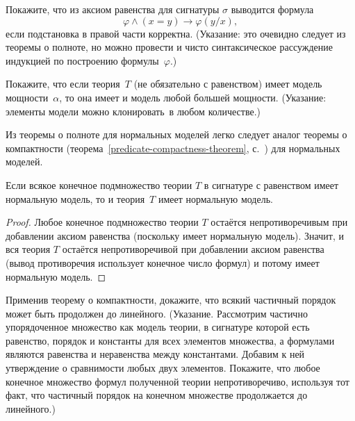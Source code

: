 \begin{problem}
Покажите, что из аксиом равенства для сигнатуры $\sigma$
выводится формула
        $$
 \varphi \land (x=y) \to \varphi(y/x),
        $$
если подстановка в правой части корректна. (Указание:
это очевидно следует из теоремы о полноте, но можно провести
и чисто синтаксическое рассуждение индукцией по построению
формулы~$\varphi$.)
\end{problem}

\begin{problem}
        \label{clones}%
Покажите, что если теория~$T$ (не обязательно с равенством)
имеет модель мощности~$\alpha$, то она имеет и модель
любой большей мощности. (Указание: элементы модели можно
 клонировать\ в любом количестве.)
\end{problem}

Из теоремы о полноте для нормальных моделей легко следует аналог
теоремы о компактности
(теорема~\ref{predicate-compactness-theorem},
с.~\pageref{predicate-compactness-theorem}) для нормальных
моделей.

\begin{theorem}
        \label{normal-compactness}%
Если всякое конечное подмножество теории $T$ в сигнатуре
с равенством имеет нормальную модель, то и теория~$T$
имеет нормальную модель.
\end{theorem}

\begin{proof}
Любое конечное подмножество теории $T$ остаётся непротиворечивым
при добавлении аксиом равенства (поскольку имеет нормальную модель).
Значит, и вся теория $T$ остаётся непротиворечивой при
добавлении аксиом равенства (вывод противоречия использует
конечное число формул) и потому имеет нормальную модель.
\end{proof}

\begin{problem}
Применив теорему о компактности, докажите, что всякий частичный
порядок может быть продолжен до линейного. (Указание. Рассмотрим
частично упорядоченное множество как модель теории, в сигнатуре
которой есть равенство, порядок и константы для всех элементов
множества, а формулами являются равенства и неравенства между
константами. Добавим к ней утверждение о сравнимости любых двух
элементов. Покажите, что любое конечное множество формул
полученной теории непротиворечиво, используя тот факт, что
частичный порядок на конечном множестве продолжается до
линейного.)
\end{problem}


